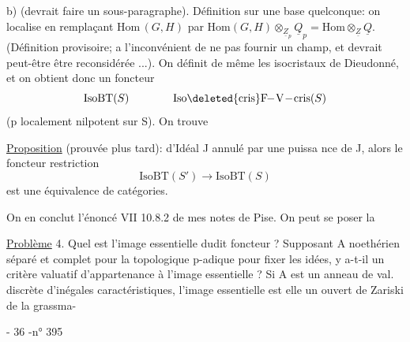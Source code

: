 b)   (devrait faire un sous-paragraphe). Définition sur une base quelconque: on localise  en remplaçant $\mathrm{Hom}\,(G,H)$ par $\mathrm{Hom}(G,H)\otimes_{\underline{Z}_p}\underline{Q}_p=\mathrm{Hom}\otimes_{\underline{Z}}\underline{Q}$. (Définition provisoire;   a l'inconvénient de ne pas fournir un champ, et devrait peut-être être reconsidérée ...). On définit de même les isocristaux de Dieudonné, et on obtient donc un foncteur
\[
\mathrm{IsoBT}(S)\qquad\qquad\mathrm{Iso}\deleted{\mathrm{cris}}\mathrm{F\!\! -\! V\! -\! cris}(S)
\]
(p localement nilpotent sur S). On trouve

\uline{Proposition} (prouvée plus tard):   d'Idéal J annulé par une puissa nce de J, alors le foncteur restriction
\[
\mathrm{IsoBT}(S')\longrightarrow\mathrm{IsoBT}(S)
\]
est une équivalence de catégories.

On en conclut l'énoncé VII 10.8.2 de mes notes de Pise. On peut se poser la 

\uline{Problème} 4. Quel est l'image essentielle dudit foncteur ? Supposant A noethérien séparé et complet pour la topologique p-adique pour fixer les idées, y a-t-il un critère valuatif d'appartenance à l'image essentielle ? Si A est un anneau de val. discrète \deleted{\unsure{(}}d'inégales caractéristiques, l'image essentielle est elle un ouvert de Zariski de la grassma-

\hfill - 36 -\hfill n° 395

